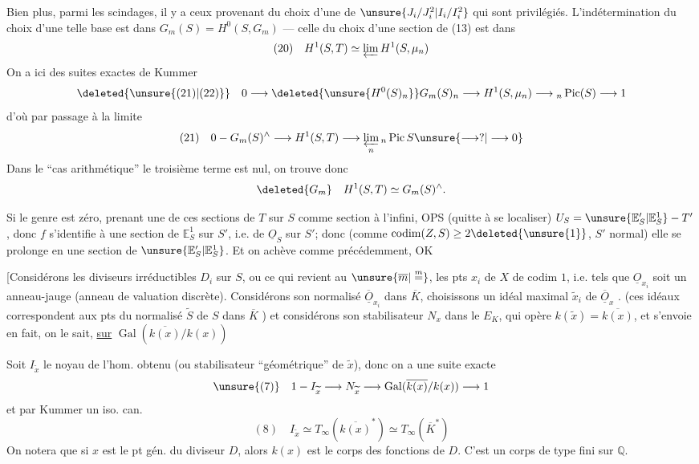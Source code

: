 Bien plus, parmi les scindages, il y a ceux provenant du choix d'une  de $\unsure{J_i/J_i^2|I_i/I_i^2}$ qui sont privilégiés. L'indétermination du choix d'une telle base est dans $G_m(S)=H^0(S,G_m)$ --- celle du choix d'une section de (13) est dans
\[
(20)\quad H^1(S,T)\simeq\varprojlim H^1(S,\mu_n)
\]
On a ici des suites exactes de Kummer
\[
\deleted{\unsure{(21)|(22)}}\quad 0\longrightarrow\deleted{\unsure{H^0(S)_n}}G_m(S)_n\longrightarrow H^1(S,\mu_n)\longrightarrow{}_n\operatorname{Pic}(S)\longrightarrow1
\]
d'où par passage à la limite
\[
(21)\quad 0-G_m(S)^\wedge\longrightarrow H^1(S,T)\longrightarrow\varprojlim_n{}_n\operatorname{Pic}S\unsure{\longrightarrow?|\longrightarrow0}
\]
Dans le ``cas arithmétique'' le troisième terme est nul, on trouve donc
\[
\deleted{G_m}\quad H^1(S,T)\simeq G_m(S)^\wedge.
\]

Si le genre est zéro, prenant une de ces sections de $T$ sur $S$ comme section à l'infini, OPS (quitte à se localiser) $U_S=\unsure{\mathbb E'_S|\mathbb E^1_S}-T'$, donc $f$ s'identifie à une section de $\mathbb E^1_S$ sur $S'$, i.e. de $\underline O_S$ sur $S'$; donc (comme $\operatorname{codim}(Z,S)\geq2\deleted{\unsure{1}}$, $S'$ normal) elle se prolonge en une section de $\unsure{\mathbb E'_S|\mathbb E^1_S}$. Et on achève comme précédemment, OK

[Considérons  les diviseurs irréductibles $D_i$ sur $S$, ou ce qui revient au $\unsure{\overline m|\overset{m}{=}}$, les pts $x_i$ de $X$ de codim $1$, i.e. tels que $\underline O_{x_i}$ soit un anneau-jauge (anneau de valuation discrète). Considérons son normalisé $\overline{\underline O}_{x_i}$ dans $\overline K$, choisissons un idéal maximal $\widetilde x_i$ de $\overline{\underline O}_x$ . (ces idéaux correspondent aux pts du normalisé $\widetilde S$ de $S$ dans $\overline K$ ) et considérons son stabilisateur $N_x$ dans le $E_K$, qui opère  $k(\widetilde x)=\overline{k(x)}$, et s'envoie en fait, on le sait, \uline{sur} $\operatorname{Gal}(\overline{k(x)}/k(x))$

Soit $I_{\widetilde x}$ le noyau de l'hom. obtenu (ou stabilisateur ``géométrique'' de $\widetilde x$), donc on a une suite exacte
\[
\unsure{(7)}\quad 1-I_{\widetilde x}\longrightarrow N_{\widetilde x}\longrightarrow\operatorname{Gal}(\overline{k(x)}/k(x))\longrightarrow1
\]
et par Kummer un iso. can.
\[
(8)\quad I_{\widetilde x}\simeq T_\infty(\overline{k(x)}^*)\simeq T_\infty(\overline K^*)
\]
On notera que si $x$ est le pt gén. du diviseur $D$, alors $k(x)$ est le corps des fonctions de $D$. C'est un corps de type fini sur $\mathbb Q$.

